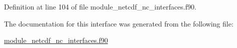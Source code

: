 Definition at line 104 of file module\+\_\+netcdf\+\_\+nc\+\_\+interfaces.\+f90.



The documentation for this interface was generated from the following file\+:\begin{DoxyCompactItemize}
\item 
\hyperlink{module__netcdf__nc__interfaces_8f90}{module\+\_\+netcdf\+\_\+nc\+\_\+interfaces.\+f90}\end{DoxyCompactItemize}
